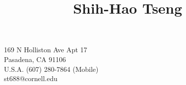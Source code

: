 \title{Shih-Hao Tseng}{
169 N Holliston Ave Apt 17\\
Pasadena, CA 91106\\
U.S.A.
}{
(607) 280-7864 (Mobile) \\
st688@cornell.edu
}